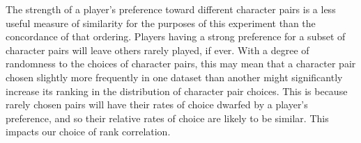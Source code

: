 The strength of a player's preference toward different character pairs is a less
useful measure of similarity for the purposes of this experiment than the
concordance of that ordering. Players having a strong preference for a subset of
character pairs will leave others rarely played, if ever. With a degree of
randomness to the choices of character pairs, this may mean that a character
pair chosen slightly more frequently in one dataset than another might
significantly increase its ranking in the distribution of character pair
choices. This is because rarely chosen pairs will have their rates of choice
dwarfed by a player's preference, and so their relative rates of choice are
likely to be similar. This impacts our choice of rank correlation.







